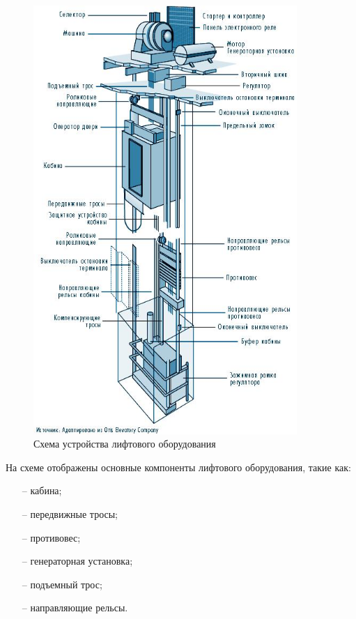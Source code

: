 			\begin{figure}[h]
				\centering
				\includegraphics[width=100mm]{src/pictures/domainknowledge.png}
				\caption{Схема устройства лифтового оборудования}\label{dk1}
			\end{figure}

		На схеме отображены основные компоненты лифтового оборудования, такие как:
			\begin{itemize}
				\item[--] кабина;
				\item[--] передвижные тросы;
				\item[--] противовес;
				\item[--] генераторная установка;
				\item[--] подъемный трос;
				\item[--] направляющие рельсы.
			\end{itemize}

